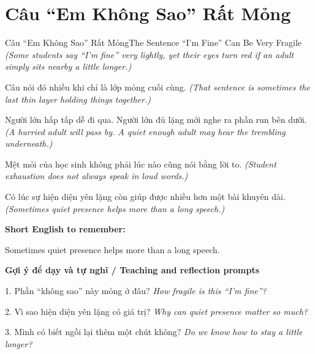 \section{Câu “Em Không Sao” Rất Mỏng}
\begin{truyen}{Câu “Em Không Sao” Rất Mỏng}{The Sentence “I’m Fine” Can Be Very Fragile}
\textit{(Some students say “I’m fine” very lightly, yet their eyes turn red if an adult simply sits nearby a little longer.)}

Câu nói đó nhiều khi chỉ là lớp mỏng cuối cùng.
\textit{(That sentence is sometimes the last thin layer holding things together.)}

Người lớn hấp tấp dễ đi qua. Người lớn đủ lặng mới nghe ra phần run bên dưới.
\textit{(A hurried adult will pass by. A quiet enough adult may hear the trembling underneath.)}

Mệt mỏi của học sinh không phải lúc nào cũng nói bằng lời to.
\textit{(Student exhaustion does not always speak in loud words.)}

\end{truyen}

\begin{baihoc}
Có lúc sự hiện diện yên lặng còn giúp được nhiều hơn một bài khuyên dài.
\textit{(Sometimes quiet presence helps more than a long speech.)}
\end{baihoc}

\begin{ghinhoanh}
\textbf{Short English to remember:}

Sometimes quiet presence helps more than a long speech.

\end{ghinhoanh}

\begin{tuhocnhanh}
\textbf{Gợi ý để dạy và tự nghĩ / Teaching and reflection prompts}

1. Phần “không sao” này mỏng ở đâu? \textit{How fragile is this “I’m fine”?}

2. Vì sao hiện diện yên lặng có giá trị? \textit{Why can quiet presence matter so much?}

3. Mình có biết ngồi lại thêm một chút không? \textit{Do we know how to stay a little longer?}
\end{tuhocnhanh}
\ngancach

